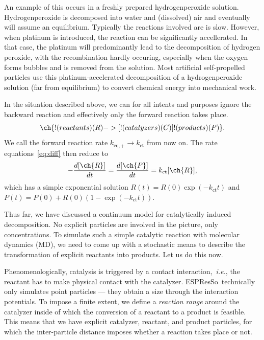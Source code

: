 \documentclass[aip,jcp,reprint,a4paper,onecolumn,nofootinbib,amsmath,amssymb]{revtex4-1}
\newcommand{\es}{\mbox{\textsf{ESPResSo}}\xspace}
\begin{document}
An example of this occurs in a freshly prepared hydrogenperoxide solution. Hydrogenperoxide is decomposed into water and (dissolved) air and eventually will assume an equilibrium. Typically the reactions involved are is slow. However, when platinum is introduced, the reaction can be significantly accellerated. In that case, the platinum will predominantly lead to the decomposition of hydrogen peroxide, with the recombination hardly occuring, especially when the oxygen forms bubbles and is removed from the solution. Most artificial self-propelled particles use this platinum-accelerated decomposition of a hydrogenperoxide solution (far from equilibrium) to convert chemical energy into mechanical work.  

In the situation described above, we can for all intents and purposes ignore the backward reaction and effectively only the forward reaction takes place.
\begin{equation}
  \label{eq:cat}
  \ch{!(reactants)(R) ->[ !(catalyzers)(C) ] !(products)(P)} .
\end{equation}
We call the forward reaction rate $k_{\text{eq},+} \to k_{\text{ct}}$ from now on. The rate equations~\eqref{eq:diff} then reduce to
\begin{equation}
  \label{eq:diff-cat}
  -\frac{d[\ch{R}]}{dt} = \frac{d[\ch{P}]}{dt} = k_{\text{ct}}[\ch{R}] ,
\end{equation}
which has a simple exponential solution $R(t) = R(0)\exp(- k_{\text{ct}} t)$ and $P(t) = P(0) + R(0)(1 - \exp(- k_{\text{ct}} t))$.

Thus far, we have discussed a continuum model for catalytically induced decomposition. No explicit particles are involved in the picture, only concentrations. To simulate such a simple catalytic reaction with molecular dynamics (MD), we need to come up with a stochastic means to describe the transformation of explicit reactants into products. Let us do this now.

Phenomenologically, catalysis is triggered by a contact interaction,~\textit{i.e.}, the reactant has to make physical contact with the catalyzer. \es\ technically only simulates point particles --- they obtain a size through the interaction potentials. To impose a finite extent, we define a \textit{reaction range} around the catalyzer inside of which the conversion of a reactant to a product is feasible. This means that we have explicit catalyzer, reactant, and product particles, for which the inter-particle distance imposes whether a reaction takes place or not.
\end{document}
